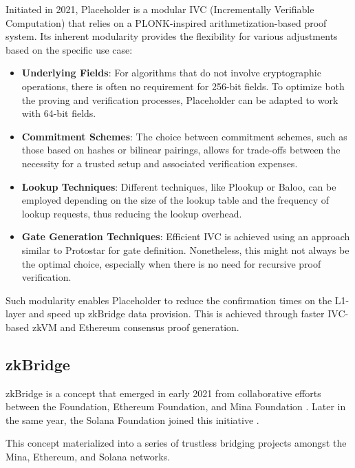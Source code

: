 Initiated in 2021, Placeholder \cite{placeholder} is 
a modular IVC (Incrementally Verifiable Computation) that relies 
on a PLONK-inspired arithmetization-based proof system. 
Its inherent modularity provides the flexibility for various adjustments based on the specific use case:

\begin{itemize}
    \item \textbf{Underlying Fields}: 
        For algorithms that do not involve cryptographic operations, 
        there is often no requirement for 256-bit fields. 
        To optimize both the proving and verification processes, 
        Placeholder can be adapted to work with 64-bit fields.
    \item \textbf{Commitment Schemes}:
        The choice between commitment schemes, such as 
        those based on hashes or bilinear pairings, allows 
        for trade-offs between the necessity for a trusted setup 
        and associated verification expenses.
    \item \textbf{Lookup Techniques}:
        Different techniques, like Plookup or Baloo, can be employed 
        depending on the size of the lookup table and 
        the frequency of lookup requests, thus reducing the lookup overhead.
    \item \textbf{Gate Generation Techniques}:
        Efficient IVC is achieved using an approach similar to 
        Protostar for gate definition. Nonetheless, this might 
        not always be the optimal choice, especially when there is 
        no need for recursive proof verification.
\end{itemize}

Such modularity enables Placeholder to reduce the confirmation times 
on the L1-layer and speed up zkBridge data provision. 
This is achieved through faster IVC-based zkVM 
and Ethereum consensus proof generation.


\subsection{zkBridge}

zkBridge is a concept that emerged in early 2021 from collaborative efforts 
between the \nil Foundation, Ethereum Foundation, and Mina Foundation 
\cite{evm-mina-verification-design}. 
Later in the same year, the Solana Foundation joined this initiative 
\cite{evm-solana-verification-design}.

This concept materialized into a series of trustless bridging 
 projects amongst the Mina, Ethereum, and Solana networks. 

